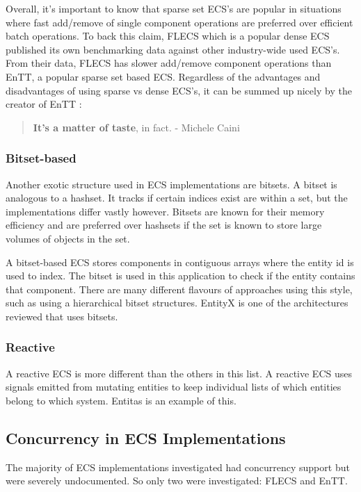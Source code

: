 Overall, it's important to know that sparse set ECS's are popular in situations where fast add/remove of single component operations are preferred over efficient batch operations. To back this claim, FLECS which is a popular dense ECS published its own benchmarking data against other industry-wide used ECS's. From their data, FLECS has slower add/remove component operations than EnTT, a popular sparse set based ECS.\cite{FLECS_EnTTCompare} Regardless of the advantages and disadvantages of using sparse vs dense ECS's, it can be summed up nicely by the creator of EnTT \cite{EnTT_archetype_and_quote}:

\begin{quote}
    \textbf{It’s a matter of taste}, in fact.
        - Michele Caini
\end{quote}

\subsubsection{Bitset-based}
Another exotic structure used in ECS implementations are bitsets. A bitset is analogous to a hashset. It tracks if certain indices exist are within a set, but the implementations differ vastly however. Bitsets are known for their memory efficiency and are preferred over hashsets if the set is known to store large volumes of objects in the set. \cite{Sutherland2014}

A bitset-based ECS stores components in contiguous arrays where the entity id is used to index. The bitset is used in this application to check if the entity contains that component. There are many different flavours of approaches using this style, such as using a hierarchical bitset structures. \cite{SanderMertensFAQ} EntityX is one of the architectures reviewed that uses bitsets.

\subsubsection{Reactive}
A reactive ECS is more different than the others in this list. A reactive ECS uses signals emitted from mutating entities to keep individual lists of which entities belong to which system. Entitas is an example of this. \cite{SanderMertensECS}

\subsection{Concurrency in ECS Implementations}
The majority of ECS implementations investigated had concurrency support but were severely undocumented. So only two were investigated: FLECS and EnTT.

